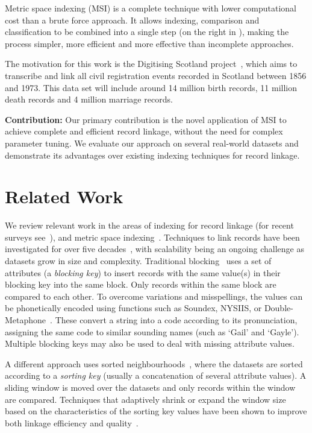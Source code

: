 \documentclass{llncs}
\begin{document}
Metric space indexing (MSI) is a complete technique with lower
computational cost than a brute force approach. It allows indexing,
comparison and classification to be combined into a single step (on the
right in ), making the process simpler, more
efficient and more effective than incomplete approaches.

The motivation for this work is
the Digitising Scotland project~\cite{Dibben2012}, which aims to
transcribe and link all civil registration events recorded in Scotland
between 1856 and 1973. This data set will include around 14 million
birth records, 11 million death records and 4 million marriage records.

\smallskip
\textbf{Contribution:} Our primary contribution is the novel application
of MSI to achieve complete and efficient record linkage, without the
need for complex parameter tuning. We evaluate our approach on several
real-world datasets and demonstrate its advantages over existing
indexing techniques for record linkage.

\section{Related Work}
\label{sec-related}

We review relevant work in the areas of indexing for record linkage (for
recent surveys see~\cite{Chr12b,Pap16}), and metric space
indexing~\cite{Zezula2010}. Techniques to link records have been
investigated for over five decades~\cite{Fel69,New59}, with scalability
being an ongoing challenge as datasets grow in size and complexity.
Traditional blocking~\cite{Chr12b} uses a set of attributes (a
\emph{blocking key}) to insert records with the same value(s) in their
blocking key into the same block. Only records within the same block are
 compared to each other. To overcome variations and misspellings, the
values can be phonetically encoded using functions such as Soundex,
NYSIIS, or Double-Metaphone~\cite{Chr12}. These convert a string into a
code according to its pronunciation, assigning the same code to similar
sounding names (such as `Gail' and `Gayle'). Multiple blocking keys may
also be used to deal with missing attribute values.

A different approach uses sorted neighbourhoods~\cite{Mon96}, where the
datasets are sorted according to a \emph{sorting key} (usually a
concatenation of several attribute values). A sliding window is moved
over the datasets and only records within the window are compared.
Techniques that adaptively shrink or expand the window size based on the
characteristics of the sorting key values have been shown to improve
both linkage efficiency and quality~\cite{Dra12}.
\end{document}
